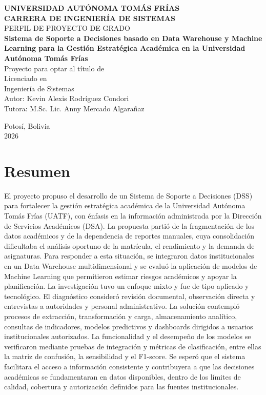 \documentclass[11pt,oneside,openany]{book}
\begin{document}
\begin{titlepage}
\thispagestyle{fancy}
\centering
\vspace*{1.2cm}
{\large\bfseries UNIVERSIDAD AUTÓNOMA TOMÁS FRÍAS\\[0.4cm]
CARRERA DE INGENIERÍA DE SISTEMAS}\\[1.5cm]
{\large PERFIL DE PROYECTO DE GRADO}\\[1.2cm]
 {\bfseries Sistema de Soporte a Decisiones basado en Data Warehouse y Machine Learning para la Gestión Estratégica Académica en la Universidad Autónoma Tomás Frías}\\[1.5cm]
Proyecto para optar al título de\\ Licenciado en\\ Ingeniería de Sistemas\\[1cm]
Autor: Kevin Alexis Rodríguez Condori\\[0.35cm]
Tutora: M.Sc. Lic. Anny Mercado Algarañaz\par
\vfill
Potosí, Bolivia\\
2026
\end{titlepage}

\chapter*{Resumen}
\begingroup
\setlength{\parindent}{0pt}
El proyecto propuso el desarrollo de un Sistema de Soporte a Decisiones (DSS) para fortalecer la gestión estratégica académica de la Universidad Autónoma Tomás Frías (UATF), con énfasis en la información administrada por la Dirección de Servicios Académicos (DSA). La propuesta partió de la fragmentación de los datos académicos y de la dependencia de reportes manuales, cuya consolidación dificultaba el análisis oportuno de la matrícula, el rendimiento y la demanda de asignaturas. Para responder a esta situación, se integraron datos institucionales en un Data Warehouse multidimensional y se evaluó la aplicación de modelos de Machine Learning que permitieron estimar riesgos académicos y apoyar la planificación. La investigación tuvo un enfoque mixto y fue de tipo aplicado y tecnológico. El diagnóstico consideró revisión documental, observación directa y entrevistas a autoridades y personal administrativo. La solución contempló procesos de extracción, transformación y carga, almacenamiento analítico, consultas de indicadores, modelos predictivos y dashboards dirigidos a usuarios institucionales autorizados. La funcionalidad y el desempeño de los modelos se verificaron mediante pruebas de integración y métricas de clasificación, entre ellas la matriz de confusión, la sensibilidad y el F1-score. Se esperó que el sistema facilitara el acceso a información consistente y contribuyera a que las decisiones académicas se fundamentaran en datos disponibles, dentro de los límites de calidad, cobertura y autorización definidos para las fuentes institucionales.
\end{document}
